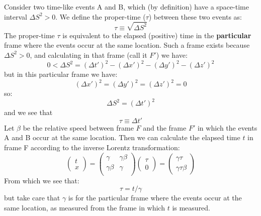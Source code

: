 \documentclass[12pt]{article}
\begin{document}
Consider two time-like events A and B, which (by definition) have a
space-time interval $\Delta S^2 > 0$.  We define the proper-time
($\tau$) between these two events as:
$$\tau \equiv \sqrt{\Delta S^2}$$
The proper-time $\tau$ is equivalent to the elapsed (positive) time in the {\bf
  particular} frame where the events occur at the same location.  Such
a frame exists because $\Delta S^2 > 0$, and calculating in that frame
(call it $F'$) we have:
$$ 0 < \Delta S^2 = (\Delta t')^2 - (\Delta x')^2 - (\Delta y')^2- (\Delta z')^2$$
but in this particular frame we have:
$$(\Delta x')^2 = (\Delta y')^2 = (\Delta z')^2 = 0$$
so:
$$\Delta S^2 = (\Delta t')^2$$
and we see that
$$\tau \equiv \Delta t'$$
Let $\beta$ be the relative speed between frame $F$ and the frame $F'$ in
which the events A and B occur at the same location.  Then we can
calculate the elapsed time $t$ in frame F according to the inverse Lorentz
transformation:\\
\begin{equation*}
\begin{pmatrix} t \\ x \end{pmatrix} =
\begin{pmatrix} \gamma & \gamma \beta \\ \gamma \beta & \gamma \\ \end{pmatrix}
\begin{pmatrix} \tau \\ 0 \end{pmatrix}
= \begin{pmatrix}  \gamma \tau \\ \gamma \tau \beta \end{pmatrix}
\end{equation*}
From which we see that:\\
\begin{equation}
\tau = t / \gamma
\end{equation}
but take care that $\gamma$ is for the particular frame where the
events occur at the same location, as measured from the frame in which
$t$ is measured.
\end{document}
